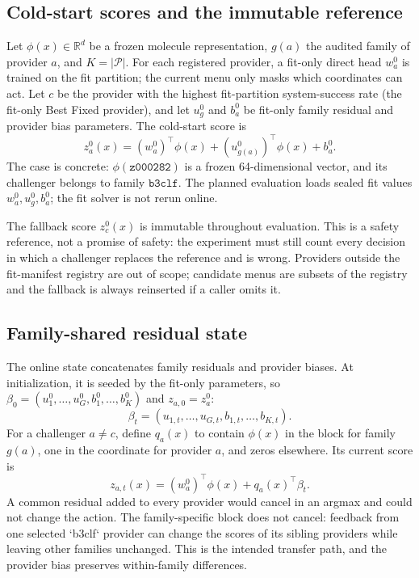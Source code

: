 \documentclass[sigconf,anonymous]{aamas}
\begin{document}
\subsection{Cold-start scores and the immutable reference}
Let $\phi(x)\in\mathbb{R}^{d}$ be a frozen molecule representation, $g(a)$ the audited family of provider $a$, and $K=|\mathcal P|$. For each registered provider, a fit-only direct head $w_a^0$ is trained on the fit partition; the current menu only masks which coordinates can act. Let $c$ be the provider with the highest fit-partition system-success rate (the fit-only Best Fixed provider), and let $u_g^0$ and $b_a^0$ be fit-only family residual and provider bias parameters. The cold-start score is
$$
z_a^0(x)=(w_a^0)^\top\phi(x)+(u_{g(a)}^0)^\top\phi(x)+b_a^0.
$$
The case is concrete: $\phi(\texttt{z000282})$ is a frozen 64-dimensional vector, and its challenger belongs to family $\texttt{b3clf}$. The planned evaluation loads sealed fit values $w_a^0,u_g^0,b_a^0$; the fit solver is not rerun online.

The fallback score $z_c^0(x)$ is immutable throughout evaluation. This is a safety reference, not a promise of safety: the experiment must still count every decision in which a challenger replaces the reference and is wrong. Providers outside the fit-manifest registry are out of scope; candidate menus are subsets of the registry and the fallback is always reinserted if a caller omits it.

\subsection{Family-shared residual state}
The online state concatenates family residuals and provider biases. At initialization, it is seeded by the fit-only parameters, so $\beta_0=(u_1^0,\ldots,u_G^0,b_1^0,\ldots,b_K^0)$ and $z_{a,0}=z_a^0$:
$$
\beta_t=(u_{1,t},\ldots,u_{G,t},b_{1,t},\ldots,b_{K,t}).
$$
For a challenger $a\neq c$, define $q_a(x)$ to contain $\phi(x)$ in the block for family $g(a)$, one in the coordinate for provider $a$, and zeros elsewhere. Its current score is
$$
z_{a,t}(x)=(w_a^0)^\top\phi(x)+q_a(x)^\top\beta_t.
$$
A common residual added to every provider would cancel in an argmax and could not change the action. The family-specific block does not cancel: feedback from one selected `b3clf` provider can change the scores of its sibling providers while leaving other families unchanged. This is the intended transfer path, and the provider bias preserves within-family differences.
\end{document}
